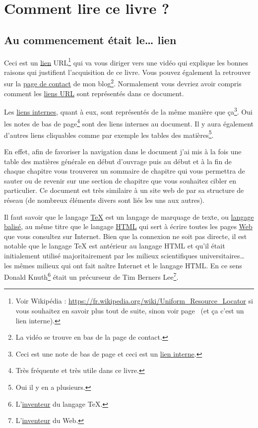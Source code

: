 \chapter{Comment lire ce livre ?}\label{chap:howto}
\newpage
\minitoc
\newpage

\section{Au commencement était le\dots\xspace lien}\label{sec:link}

Ceci est un \href{https://youtu.be/K88qlGcd7Ek}{lien}
\hypertarget{url}{URL}\footnote{Voir Wikipédia :
  \url{https://fr.wikipedia.org/wiki/Uniform_Resource_Locator} si vous
  souhaitez en savoir plus tout de suite, sinon voir
  page~\pageref{sec:side} (et ça c'est un lien interne).} qui va vous diriger vers une vidéo qui
explique les bonnes raisons qui justifient l'acquisition de ce
livre. Vous pouvez également la retrouver sur la \href{http://doyouspeakenglish.fr/contact/}{page de contact} de mon
blog\footnote{La vidéo se trouve en bas de la page de contact.}. Normalement vous
devriez avoir compris comment les
\href{https://fr.wikipedia.org/wiki/Uniform_Resource_Locator}{liens
  URL} sont représentés dans ce document.

Les \hyperlink{linkin}{liens internes}, quant à eux,
\hypertarget{retour}{sont}\label{retour} représentés de la même
manière que ça\footnote{Ceci est une note de bas de page et ceci est
  un \hyperlink{linkin}{lien interne}.}. Oui les notes de bas de
page\footnote{Très fréquente et très utile dans ce livre.} sont des
liens internes au document. Il y aura également d'autres liens
cliquables comme par exemple les tables des matières\footnote{Oui il y
  en a plusieurs.}. 

En effet, afin de favoriser la navigation dans le document j'ai mis à la
fois une table des matières générale en début d'ouvrage puis au début
et à la fin de chaque chapitre vous trouverez un sommaire de chapitre
qui vous permettra de sauter ou de revenir sur une section de
chapitre que vous souhaitez cibler en particulier. Ce document est
très similaire à un site web de par sa structure de réseau (de
nombreux éléments divers sont liés les uns aux autres).

Il faut savoir que le langage
\href{https://fr.wikipedia.org/wiki/TeX}{\TeX} est un langage de
marquage de texte, ou \underline{langage balisé}, au même titre que le 
langage \href{https://fr.wikipedia.org/wiki/Langage_de_balisage\#Langage_HTML}{HTML}
qui sert à écrire toutes les pages  \href{https://fr.wikipedia.org/wiki/World_Wide_Web}{Web}
que vous consultez sur Internet. Bien que la connexion ne soit pas
directe, il est notable que le langage \TeX{} est antérieur au langage
HTML et qu'il était initialement utilisé majoritairement par les
milieux scientifiques universitaires\dots\xspace{} les mêmes milieux qui ont
fait naître Internet et le langage HTML. En ce sens Donald
Knuth\footnote{L'\href{https://fr.wikipedia.org/wiki/Donald_Knuth}{inventeur} du langage \TeX{}.} était un précurseur de
Tim Berners Lee\footnote{L'\href{https://fr.wikipedia.org/wiki/Tim_Berners-Lee}{inventeur} du Web.}.

